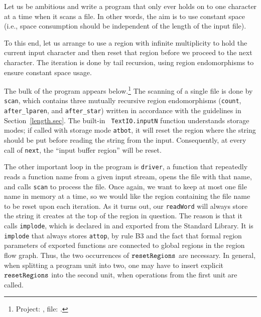 \documentclass[12pt]{book}
\begin{document}
Let us be ambitious and write a program that only ever holds on to one character at a
time when it scans a file. In other words, the aim is to use constant space (i.e., space
consumption should be independent of the length of the input file).

To this end, let us arrange to use a region with infinite multiplicity to
hold the current input character and then reset that region before we proceed
to the next character. The iteration is done by tail recursion, using region
endomorphisms to ensure constant space usage.

The bulk of the program appears below.\footnote{Project:
  , file: .} The
scanning of a single file is done by {\tt scan}, which contains three
mutually recursive region endomorphisms ({\tt count}, {\tt
  after\_lparen}, and {\tt after\_star}) written in accordance with
the guidelines in Section~\ref{length.sec}. The built-in {\tt
  TextIO.inputN} function understands storage modes; if called with
storage mode {\tt atbot}, it will reset the region where the string
should be put before reading the string from the input.  Consequently,
at every call of {\tt next}, the ``input buffer region'' will be
reset.

The other important loop in the program is {\tt driver}, a function that
repeatedly reads a function name from a given input stream, opens the file
with that name, and calls {\tt scan} to process the file. Once again, we
want to keep at most one file name in memory at a time, so we would like
the region containing the file name to be reset upon each iteration.
As it turns out, our {\tt readWord} will always store the string it
creates at the top of the region in question. The reason is that
it calls {\tt implode}, which is declared in and exported from 
the Standard Library. It is {\tt implode} that always stores {\tt attop}, by
rule B3 and the fact that formal region parameters of exported functions
are connected to global regions in the region flow graph. 
Thus, the two occurrences of $\hbox{\tt resetRegions}$ are necessary. In general,
when splitting a program unit into two, one may have 
to insert explicit $\hbox{\tt resetRegions}$ into the second unit, when operations from the
first unit are called. 
\end{document}
